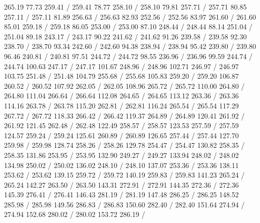 { 265.19 77.73 259.41 /
 259.41 78.77 258.10 /
 258.10 79.81 257.71 /
 257.71 80.85 257.11 /
 257.11 81.89 256.63 /
 256.63 82.93 252.56 /
 252.56 83.97 261.60 /
 261.60 85.01 259.18 /
 259.18 86.05 253.00 /
 253.00 87.10 248.44 /
 248.44 88.14 251.04 /
 251.04 89.18 243.17 /
 243.17 90.22 241.62 /
 241.62 91.26 239.58 /
 239.58 92.30 238.70 /
 238.70 93.34 242.60 /
 242.60 94.38 238.94 /
 238.94 95.42 239.80 /
 239.80 96.46 240.81 /
 240.81 97.51 244.72 /
 244.72 98.55 236.96 /
 236.96 99.59 244.74 /
 244.74 100.63 247.17 /
 247.17 101.67 248.96 /
 248.96 102.71 246.97 /
 246.97 103.75 251.48 /
 251.48 104.79 255.68 /
 255.68 105.83 259.20 /
 259.20 106.87 260.52 /
 260.52 107.92 262.05 /
 262.05 108.96 265.72 /
 265.72 110.00 264.80 /
 264.80 111.04 266.64 /
 266.64 112.08 264.65 /
 264.65 113.12 263.36 /
 263.36 114.16 263.78 /
 263.78 115.20 262.81 /
 262.81 116.24 265.54 /
 265.54 117.29 267.72 /
 267.72 118.33 266.42 /
 266.42 119.37 264.89 /
 264.89 120.41 261.92 /
 261.92 121.45 262.48 /
 262.48 122.49 258.57 /
 258.57 123.53 257.59 /
 257.59 124.57 259.24 /
 259.24 125.61 260.89 /
 260.89 126.65 257.44 /
 257.44 127.70 259.98 /
 259.98 128.74 258.26 /
 258.26 129.78 254.47 /
 254.47 130.82 258.35 /
 258.35 131.86 253.95 /
 253.95 132.90 249.27 /
 249.27 133.94 248.02 /
 248.02 134.98 250.02 /
 250.02 136.02 248.10 /
 248.10 137.07 253.36 /
 253.36 138.11 253.62 /
 253.62 139.15 259.72 /
 259.72 140.19 259.83 /
 259.83 141.23 265.24 /
 265.24 142.27 263.50 /
 263.50 143.31 272.91 /
 272.91 144.35 272.36 /
 272.36 145.39 276.41 /
 276.41 146.43 281.19 /
 281.19 147.48 286.25 /
 286.25 148.52 285.98 /
 285.98 149.56 286.83 /
 286.83 150.60 282.40 /
 282.40 151.64 274.94 /
 274.94 152.68 280.02 /
 280.02 153.72 286.19 /
}
